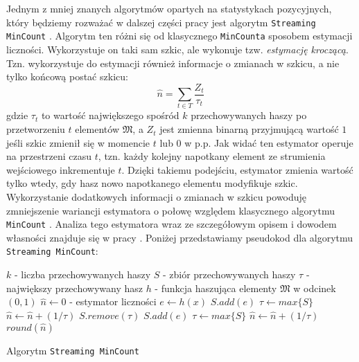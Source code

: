 Jednym z mniej znanych algorytmów opartych na statystykach pozycyjnych, który będziemy rozważać w dalszej części pracy jest algorytm \texttt{Streaming MinCount} \cite{streamed}. Algorytm ten różni się od klasycznego \texttt{MinCounta} sposobem estymacji liczności. Wykorzystuje on taki sam szkic, ale wykonuje tzw. \textit{estymację kroczącą}. Tzn. wykorzystuje do estymacji również informacje o zmianach w szkicu, a nie tylko końcową postać szkicu:
\begin{equation}
    \hat{n} = \sum_{t \in T} \frac{Z_t}{\tau_{t}}
\end{equation}
gdzie $\tau_{t}$ to wartość największego spośród $k$ przechowywanych haszy po przetworzeniu $t$ elementów $\mathfrak{M}$, a $Z_t$ jest zmienna binarną przyjmującą wartość $1$ jeśli szkic zmienił się w momencie $t$ lub $0$ w p.p. Jak widać ten estymator operuje na przestrzeni czasu $t$, tzn. każdy kolejny napotkany element ze strumienia wejściowego inkrementuje $t$. Dzięki takiemu podejściu, estymator zmienia wartość tylko wtedy, gdy hasz nowo napotkanego elementu modyfikuje szkic. Wykorzystanie dodatkowych informacji o zmianach w szkicu powoduję zmniejszenie wariancji estymatora o połowę względem klasycznego algorytmu \texttt{MinCount} \cite{ting}. Analiza tego estymatora wraz ze szczegółowym opisem i dowodem własności znajduje się w pracy \cite{streamed}. Poniżej przedstawiamy 
pseudokod dla algorytmu \texttt{Streaming MinCount}:
\newline
\begin{algorithm}
    \begin{algorithmic}
    \State $k $ - liczba przechowywanych haszy 
    \State $S  $ - zbiór przechowywanych haszy
    \State $\tau  $ - największy przechowywany hasz 
    \State $h  $ - funkcja haszująca elementy $\mathfrak{M}$ w odcinek $(0, 1)$
    \State $\hat{n} \gets 0$  - estymator liczności
    \newline
        \State $e \gets h(x)$
                \State $S.add(e)$
                \State $\tau \gets max\{S\}$
                \State $\hat{n} \gets \hat{n} + (1/\tau)$
                \State $S.remove(\tau)$
                \State $S.add(e)$
                \State $\tau \gets max\{S\}$
                \State $\hat{n} \gets \hat{n} + (1/\tau)$
            \EndIf
        \EndIf
    \EndFunction
    \newline
        \State \Return $round(\hat{n})$
    \EndFunction
    
    \end{algorithmic}
    \caption{Algorytm \texttt{Streaming MinCount}}
\end{algorithm}


